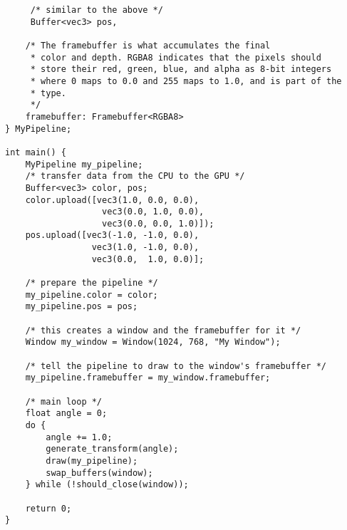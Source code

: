 \documentclass[11pt]{article}
\begin{document}
\begin{lstlisting}
     /* similar to the above */
     Buffer<vec3> pos,
    
    /* The framebuffer is what accumulates the final
     * color and depth. RGBA8 indicates that the pixels should
     * store their red, green, blue, and alpha as 8-bit integers
     * where 0 maps to 0.0 and 255 maps to 1.0, and is part of the
     * type.
     */
    framebuffer: Framebuffer<RGBA8>
} MyPipeline;

int main() {
    MyPipeline my_pipeline;
    /* transfer data from the CPU to the GPU */
    Buffer<vec3> color, pos;
    color.upload([vec3(1.0, 0.0, 0.0),
    			   vec3(0.0, 1.0, 0.0),
    			   vec3(0.0, 0.0, 1.0)]);
    pos.upload([vec3(-1.0, -1.0, 0.0),
    			 vec3(1.0, -1.0, 0.0),
    			 vec3(0.0,  1.0, 0.0)];
    			 
    /* prepare the pipeline */
    my_pipeline.color = color;
    my_pipeline.pos = pos;

    /* this creates a window and the framebuffer for it */
    Window my_window = Window(1024, 768, "My Window");
    
    /* tell the pipeline to draw to the window's framebuffer */
    my_pipeline.framebuffer = my_window.framebuffer;
    
    /* main loop */
    float angle = 0;
    do {
        angle += 1.0;
        generate_transform(angle);
        draw(my_pipeline);
        swap_buffers(window);
    } while (!should_close(window));
    
    return 0;
}

\end{lstlisting}
\end{document}
